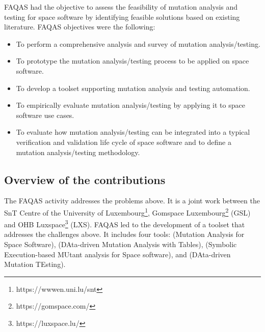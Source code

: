 FAQAS had the objective to assess the feasibility of mutation analysis and testing for space software by identifying feasible solutions based on existing literature. FAQAS objectives were the following:
\begin{itemize}
\item To perform a comprehensive analysis and survey of mutation analysis/testing.
\item To prototype the mutation analysis/testing process to be applied on space software.
\item To develop a toolset supporting mutation analysis and testing automation.
\item To empirically evaluate mutation analysis/testing by applying it to space software use cases.
\item To evaluate how mutation analysis/testing can be integrated into a typical verification and validation life cycle of space software and to define a mutation analysis/testing methodology.
\end{itemize}


\subsection*{Overview of the contributions}

The FAQAS activity addresses the problems above. It is a joint work between the SnT Centre of the University of Luxembourg\footnote{https://wwwen.uni.lu/snt}, Gomspace Luxembourg\footnote{https://gomspace.com/} (GSL) and OHB Luxspace\footnote{https://luxspace.lu/} (LXS).
FAQAS led to the development of a toolset that addresses the challenges above. It includes four tools:
 (Mutation Analysis for Space Software),
 (DAta-driven Mutation Analysis with Tables),
 (Symbolic Execution-based MUtant analysis for Space software),
and  (DAta-driven Mutation TEsting).



